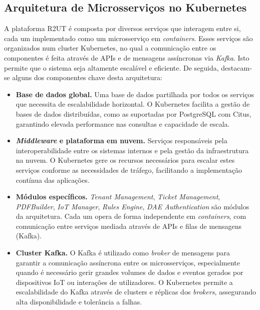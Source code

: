 \subsection{Arquitetura de Microsserviços no Kubernetes}


A plataforma R2UT é composta por diversos serviços que interagem entre si, cada um implementado como um microsserviço em \textit{containers}. Esses serviços são organizados num cluster Kubernetes, no qual a comunicação entre os componentes é feita através de APIs e de mensagens assíncronas via \textit{ Kafka}. Isto permite que o sistema seja altamente escalável e eficiente. De seguida, destacam-se alguns dos componentes chave desta arquitetura:

\begin{itemize}
    \item \textbf{Base de dados global.} Uma base de dados partilhada por todos os serviços que necessita de escalabilidade horizontal. O Kubernetes facilita a gestão de bases de dados distribuídas, como as suportadas por PostgreSQL com Citus, garantindo elevada performance nas consultas e capacidade de escala.

    \item \textbf{\textit{Middleware} e plataforma em nuvem.} Serviços responsáveis pela interoperabilidade entre os sistemas internos e pela gestão da infraestrutura na nuvem. O Kubernetes gere os recursos necessários para escalar estes serviços conforme as necessidades de tráfego, facilitando a implementação contínua das aplicações.

    \item \textbf{Módulos específicos.} \textit{Tenant Management}, \textit{Ticket Management}, \textit{PDFBuilder}, \textit{IoT Manager}, \textit{Rules Engine}, \textit{DAE Authentication} são módulos da arquitetura. Cada um opera de forma independente em \textit{containers}, com comunicação entre serviços mediada através de APIs e filas de mensagens (Kafka).

    \item \textbf{Cluster Kafka.} O Kafka é utilizado como \textit{broker} de mensagens para garantir a comunicação assíncrona entre os microsserviços, especialmente quando é necessário gerir grandes volumes de dados e eventos gerados por dispositivos IoT ou interações de utilizadores. O Kubernetes permite a escalabilidade do Kafka através de clusters e réplicas dos \textit{brokers}, assegurando alta disponibilidade e tolerância a falhas.
\end{itemize}


